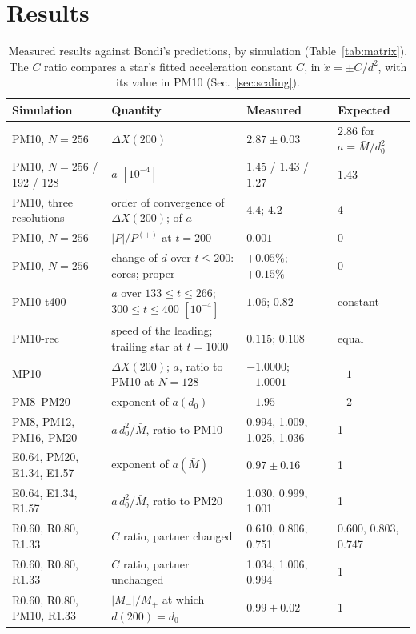 \documentclass[twocolumn,floatfix,aps,prd,superscriptaddress,nofootinbib]{revtex4-2}
\begin{document}
\section{Results}
\label{sec:results}

\begin{table}[t]
\caption{Measured results against Bondi's predictions, by simulation (Table~\ref{tab:matrix}). The $C$ ratio compares a star's fitted acceleration constant $C$, in $\ddot x=\pm C/d^2$, with its value in PM10 (Sec.~\ref{sec:scaling}).}
\label{tab:results}
\begin{ruledtabular}
\begin{tabular}{lp{}p{}l}
Simulation & Quantity & Measured & Expected \\
\hline
PM10, $N=256$ & $\Delta X(200)$ & $2.87\pm0.03$ & $2.86$ for $a=\bar M/d_0^2$ \\
PM10, $N=256$ / 192 / 128 & $a$ $[10^{-4}]$ & $1.45$ / $1.43$ / $1.27$ & $1.43$ \\
PM10, three resolutions & order of convergence of $\Delta X(200)$; of $a$ & $4.4$; $4.2$ & 4 \\
PM10, $N=256$ & $|P|/P^{(+)}$ at $t=200$ & $0.001$ & 0 \\
PM10, $N=256$ & change of $d$ over $t\le200$: cores; proper & $+0.05\%$; $+0.15\%$ & 0 \\
PM10-t400 & $a$ over $133\le t\le266$; $300\le t\le400$ $[10^{-4}]$ & $1.06$; $0.82$ & constant \\
PM10-rec & speed of the leading; trailing star at $t=1000$ & $0.115$; $0.108$ & equal \\
MP10 & $\Delta X(200)$; $a$, ratio to PM10 at $N=128$ & $-1.0000$; $-1.0001$ & $-1$ \\
PM8--PM20 & exponent of $a(d_0)$ & $-1.95$ & $-2$ \\
PM8, PM12, PM16, PM20 & $a\,d_0^2/\bar M$, ratio to PM10 & 0.994, 1.009, 1.025, 1.036 & 1 \\
E0.64, PM20, E1.34, E1.57 & exponent of $a(\bar M)$ & $0.97\pm0.16$ & 1 \\
E0.64, E1.34, E1.57 & $a\,d_0^2/\bar M$, ratio to PM20 & 1.030, 0.999, 1.001 & 1 \\
R0.60, R0.80, R1.33 & $C$ ratio, partner changed & 0.610, 0.806, 0.751 & 0.600, 0.803, 0.747 \\
R0.60, R0.80, R1.33 & $C$ ratio, partner unchanged & 1.034, 1.006, 0.994 & 1 \\
R0.60, R0.80, PM10, R1.33 & $|M_-|/M_+$ at which $d(200)=d_0$ & $0.99\pm0.02$ & 1 \\

\end{tabular}
\end{ruledtabular}
\end{table}
\end{document}
